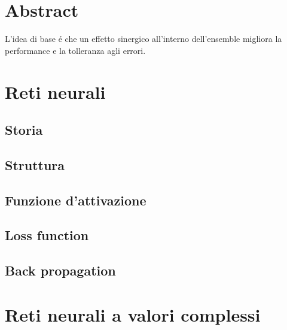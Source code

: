 \documentclass[a4paper,10pt]{article}
\date{12/08/2019}
\begin{document}
 
 \section{Abstract}
 
 L'idea di base \'e che un effetto sinergico all'interno dell'ensemble migliora la performance e la tolleranza agli errori. 
 
 
 \section{Reti neurali}
 \subsection{Storia}
 
 \subsection{Struttura}
 
 \subsection{Funzione d'attivazione}
 
 \subsection{Loss function}
 
 \subsection{Back propagation}
 
 \section{Reti neurali a valori complessi}
\end{document}
